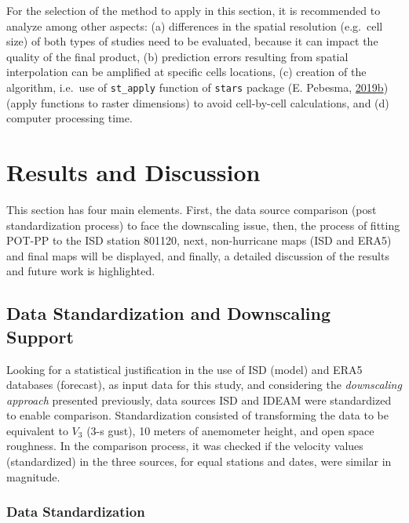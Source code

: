\documentclass[12pt,twoside]{reedthesis}
\begin{document}
For the selection of the method to apply in this section, it is recommended to analyze among other aspects: (a) differences in the spatial resolution (e.g.~cell size) of both types of studies need to be evaluated, because it can impact the quality of the final product, (b) prediction errors resulting from spatial interpolation can be amplified at specific cells locations, (c) creation of the algorithm, i.e.~use of \texttt{st\_apply} function of \texttt{stars} package (E. Pebesma, \protect\hyperlink{ref-Pebesma2019b}{2019}\protect\hyperlink{ref-Pebesma2019b}{b}) (apply functions to raster dimensions) to avoid cell-by-cell calculations, and (d) computer processing time.

\hypertarget{rmd-results}{%
\chapter{Results and Discussion}\label{rmd-results}}

This section has four main elements. First, the data source comparison (post standardization process) to face the downscaling issue, then, the process of fitting POT-PP to the ISD station 801120, next, non-hurricane maps (ISD and ERA5) and final maps will be displayed, and finally, a detailed discussion of the results and future work is highlighted.

\hypertarget{data-standardization-and-downscaling-support}{%
\section{Data Standardization and Downscaling Support}\label{data-standardization-and-downscaling-support}}

Looking for a statistical justification in the use of ISD (model) and ERA5 databases (forecast), as input data for this study, and considering the \emph{downscaling approach} presented previously, data sources ISD and IDEAM were standardized to enable comparison. Standardization consisted of transforming the data to be equivalent to \(V_3\) (3-s gust), 10 meters of anemometer height, and open space roughness. In the comparison process, it was checked if the velocity values (standardized) in the three sources, for equal stations and dates, were similar in magnitude.

\hypertarget{data-standardization}{%
\subsection{Data Standardization}\label{data-standardization}}
\end{document}
